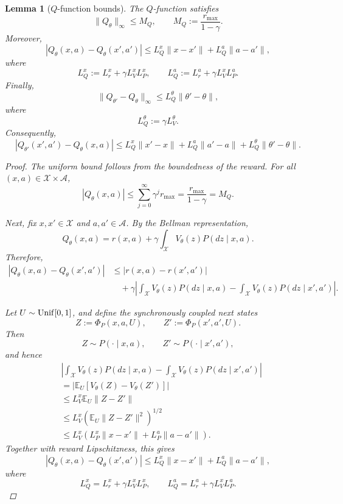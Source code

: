 \documentclass{article}
\newtheorem{lem}[thm]{Lemma}
\theoremstyle{definition}
\theoremstyle{remark}
\theoremstyle{mystyle}
\newcommand{\1}{\mathbbm{1}}
\begin{document}
\begin{lem}[\(Q\)-function bounds]
The \(Q\)-function satisfies
\[
\|Q_\theta\|_\infty
\le
M_Q,
\qquad
M_Q:=\frac{r_{\max}}{1-\gamma}.
\tag{Q0}
\]
Moreover,
\[
|Q_\theta(x,a)-Q_\theta(x',a')|
\le
L_Q^x\|x-x'\|+L_Q^a\|a-a'\|,
\tag{Qx}
\]
where
\[
L_Q^x:=L_r^x+\gamma L_V^xL_P^x,
\qquad
L_Q^a:=L_r^a+\gamma L_V^xL_P^a.
\]
Finally,
\[
\|Q_{\theta'}-Q_\theta\|_\infty
\le
L_Q^\theta\|\theta'-\theta\|,
\tag{Qtheta}
\]
where
\[
L_Q^\theta:=\gamma L_V^\theta.
\]
Consequently,
\[
|Q_{\theta'}(x',a')-Q_\theta(x,a)|
\le
L_Q^x\|x'-x\|
+
L_Q^a\|a'-a\|
+
L_Q^\theta\|\theta'-\theta\|.
\tag{Qjoint}
\]

\begin{proof}
The uniform bound follows from the boundedness of the reward. For all
\((x,a)\in\mathcal X\times\mathcal A\),
\[
|Q_\theta(x,a)|
\le
\sum_{j=0}^{\infty}\gamma^j r_{\max}
=
\frac{r_{\max}}{1-\gamma}
=
M_Q.
\]

Next, fix \(x,x'\in\mathcal X\) and \(a,a'\in\mathcal A\). By the
Bellman representation,
\[
Q_\theta(x,a)
=
r(x,a)
+
\gamma
\int_{\mathcal X}
V_\theta(z)P(dz\mid x,a).
\]
Therefore,
\[
\begin{aligned}
|Q_\theta(x,a)-Q_\theta(x',a')|
&\le
|r(x,a)-r(x',a')|
\\
&\quad+
\gamma
\left|
\int_{\mathcal X}V_\theta(z)P(dz\mid x,a)
-
\int_{\mathcal X}V_\theta(z)P(dz\mid x',a')
\right|.
\end{aligned}
\]

Let \(U\sim{\rm Unif}[0,1]\), and define the synchronously coupled next
states
\[
Z:=\Phi_P(x,a,U),
\qquad
Z':=\Phi_P(x',a',U).
\]
Then
\[
Z\sim P(\cdot\mid x,a),
\qquad
Z'\sim P(\cdot\mid x',a'),
\]
and hence
\[
\begin{aligned}
&\left|
\int_{\mathcal X}V_\theta(z)P(dz\mid x,a)
-
\int_{\mathcal X}V_\theta(z)P(dz\mid x',a')
\right|
\\
&=
\left|
\mathbb E_U
\left[
V_\theta(Z)-V_\theta(Z')
\right]
\right|
\\
&\le
L_V^x\mathbb E_U\|Z-Z'\|
\\
&\le
L_V^x
\left(
\mathbb E_U\|Z-Z'\|^2
\right)^{1/2}
\\
&\le
L_V^x
\left(
L_P^x\|x-x'\|
+
L_P^a\|a-a'\|
\right).
\end{aligned}
\]
Together with reward Lipschitzness, this gives
\[
|Q_\theta(x,a)-Q_\theta(x',a')|
\le
L_Q^x\|x-x'\|
+
L_Q^a\|a-a'\|,
\]
where
\[
L_Q^x
=
L_r^x+\gamma L_V^xL_P^x,
\qquad
L_Q^a
=
L_r^a+\gamma L_V^xL_P^a.
\]


\end{proof}
\end{lem}
\end{document}
